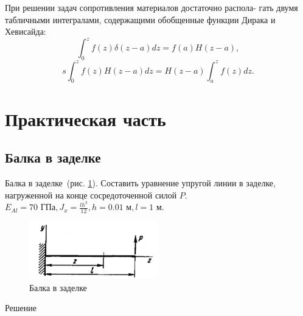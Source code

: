 \documentclass[12pt, a4paper]{article}
\begin{document}
При решении задач сопротивления материалов достаточно распола-
гать двумя табличными интегралами, содержащими обобщенные функции
Дирака и Хевисайда:
\begin{equation}
	\label{dirakint}
	\int_0^z f(z) \delta(z - a) d z = f(a)H(z - a),
\end{equation}
\begin{equation}s
	\label{heaviint}
	\int_0^z f(z) H(z - a) d z = H(z - a)\int_a^z f(z) d z.
\end{equation}


\section{Практическая часть}
\subsection{Балка в заделке}
Балка в заделке~(рис. \ref{pic7}). Составить уравнение упругой линии в заделке, нагруженной на конце сосредоточенной силой $P$. $E_{Al} = 70 \mbox{ ГПа}, J_{x} = \frac{l h^3}{12}, h = 0.01 \mbox{ м}, l = 1 \mbox{ м}$.

\begin{figure}[!h]
	\centering
	\includegraphics[width=0.5\textwidth]{pic.7}%
	\caption{Балка в заделке}
	\vspace*{-2mm}
	\label{pic7}
\end{figure}

\begin{center}Решение\end{center} 
\end{document}
